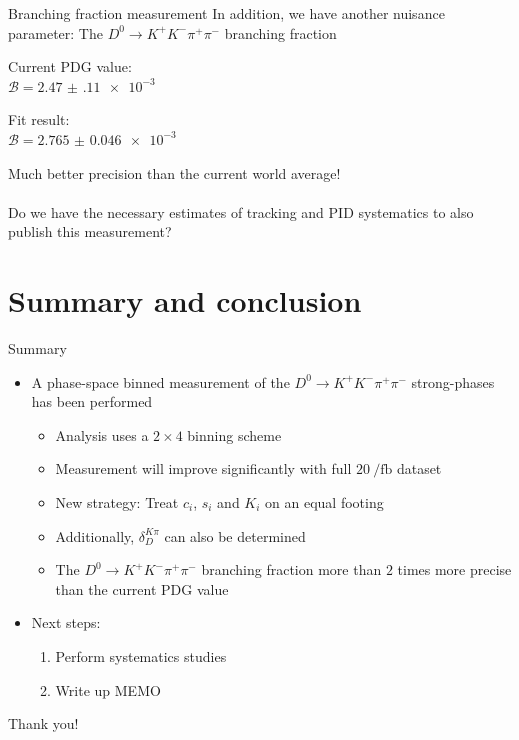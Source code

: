 \documentclass{beamer}
\begin{document}
\begin{frame}{Branching fraction measurement}
  \vspace{0.0cm}
  {\Large In addition, we have another nuisance parameter: The $D^0\to K^+K^-\pi^+\pi^-$ branching fraction\\}
  \begin{center}
    Current PDG value:\\
    $\mathcal{B} = \SI{2.47(11)e-3}{}$
  \end{center}
  \begin{center}
    Fit result:\\
    $\mathcal{B} = \SI{2.765(46)e-3}{}$
  \end{center}
  Much better precision than the current world average!\\~\\
  Do we have the necessary estimates of tracking and PID systematics to also publish this measurement?
\end{frame}

\section{Summary and conclusion}

\begin{frame}{Summary}
  \begin{itemize}
    \setlength\itemsep{1.0em}
    \item{A phase-space binned measurement of the $D^0\to K^+K^-\pi^+\pi^-$ strong-phases has been performed}
    \begin{itemize}
      \setlength\itemsep{0.7em}
      \item{Analysis uses a $2\times 4$ binning scheme}
      \item{Measurement will improve significantly with full $\SI{20}{\per\femto\barn}$ dataset}
      \item{New strategy: Treat $c_i$, $s_i$ and $K_i$ on an equal footing}
      \item{Additionally, $\delta_D^{K\pi}$ can also be determined}
      \item{The $D^0\to K^+K^-\pi^+\pi^-$ branching fraction more than $2$ times more precise than the current PDG value}
    \end{itemize}
    \item{Next steps:}
    \begin{enumerate}
      \setlength\itemsep{0.7em}
      \item{Perform systematics studies}
      \item{Write up MEMO}
    \end{enumerate}
  \end{itemize}
  \begin{center}
    {\huge Thank you!}
  \end{center}
\end{frame}
\end{document}
